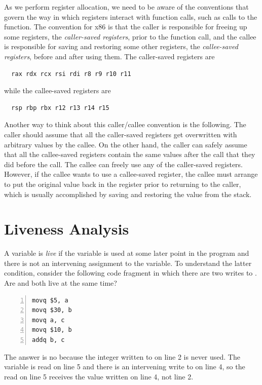 \documentclass[11pt]{book}
\begin{document}
As we perform register allocation, we need to be aware of the
conventions that govern the way in which registers interact with
function calls, such as calls to the  function. The
convention for x86 is that the caller is responsible for freeing up
some registers, the \emph{caller-saved registers}, prior to the
function call, and the callee is responsible for saving and restoring
some other registers, the \emph{callee-saved registers}, before and
after using them. The caller-saved registers are
\begin{lstlisting}
  rax rdx rcx rsi rdi r8 r9 r10 r11
\end{lstlisting}
while the callee-saved registers are
\begin{lstlisting}
  rsp rbp rbx r12 r13 r14 r15
\end{lstlisting}
Another way to think about this caller/callee convention is the
following. The caller should assume that all the caller-saved registers
get overwritten with arbitrary values by the callee.  On the other
hand, the caller can safely assume that all the callee-saved registers
contain the same values after the call that they did before the call.
The callee can freely use any of the caller-saved registers.  However,
if the callee wants to use a callee-saved register, the callee must
arrange to put the original value back in the register prior to
returning to the caller, which is usually accomplished by saving and
restoring the value from the stack.


\section{Liveness Analysis}
\label{sec:liveness-analysis-r1}

A variable is \emph{live} if the variable is used at some later point
in the program and there is not an intervening assignment to the
variable.
%
To understand the latter condition, consider the following code
fragment in which there are two writes to . Are  and
 both live at the same time?
\begin{lstlisting}[numbers=left,numberstyle=\tiny]
movq $5, a
movq $30, b
movq a, c
movq $10, b
addq b, c
\end{lstlisting}
The answer is no because the integer  written to  on
line 2 is never used. The variable  is read on line 5 and
there is an intervening write to  on line 4, so the read on
line 5 receives the value written on line 4, not line 2.
\end{document}
